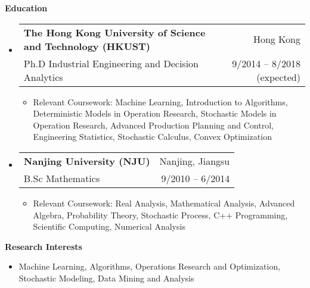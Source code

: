 \documentclass[letterpaper,10pt]{article}
\makeatletter
\newcommand{\resitem}[1]{\item #1 \vspace{-2pt}}
\newcommand{\resheading}[1]{{\large \colorbox{mygrey}{\begin{minipage}{\textwidth}{\textbf{#1 \vphantom{p\^{E}}}}\end{minipage}}}}
\newcommand{\ressubheading}[4]{
\begin{tabular*}{6.5in}{l@{\extracolsep{\fill}}r}
    \textbf{#1} & #2 \\
    #3 & #4 \\
\end{tabular*}\vspace{-6pt}}
\makeatother
\begin{document}
\resheading{Education}
\begin{itemize}
\item \ressubheading{The Hong Kong University of Science and Technology (HKUST)}{Hong Kong}{Ph.D Industrial Engineering and Decision Analytics}{9/2014 -- 8/2018 (expected)}

\begin{itemize}
\resitem{Relevant Coursework: Machine Learning, Introduction to Algorithms, Deterministic Models in Operation Research, Stochastic Models in Operation Research, Advanced Production Planning and Control, Engineering Statistics, Stochastic Calculus, Convex Optimization}
\end{itemize}

\item \ressubheading{Nanjing University (NJU)}{Nanjing, Jiangsu}{B.Sc Mathematics}{9/2010 -- 6/2014}

\begin{itemize}
\resitem{Relevant Coursework: Real Analysis, Mathematical Analysis, Advanced Algebra, Probability Theory, Stochastic Process, C++ Programming, Scientific Computing, Numerical Analysis}
\end{itemize}

\end{itemize}


\resheading{Research Interests}
\begin{itemize}
\item Machine Learning, Algorithms, Operations Research and Optimization, Stochastic Modeling, Data Mining and Analysis
\end{itemize}
\end{document}
